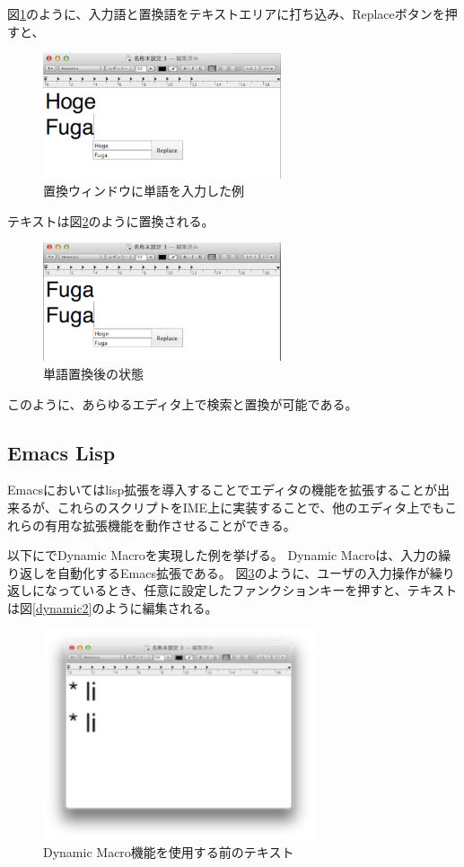 図\ref{search2}のように、入力語と置換語をテキストエリアに打ち込み、Replaceボタンを押すと、

\begin{figure}[H]
\centerline{\includegraphics[width=70mm,bb=0 0 360 191]{figures/replace2.png}}
\caption{置換ウィンドウに単語を入力した例}
\label{search2}
\end{figure}


テキストは図\ref{search3}のように置換される。

\begin{figure}[H]
\centerline{\includegraphics[width=70mm,bb=0 0 360 191]{figures/replace3.png}}
\caption{単語置換後の状態}
\label{search3}
\end{figure}

このように、あらゆるエディタ上で検索と置換が可能である。

\subsection{Emacs Lisp}
Emacsにおいてはlisp拡張を導入することでエディタの機能を拡張することが出来るが、これらのスクリプトをIME上に実装することで、他のエディタ上でもこれらの有用な拡張機能を動作させることができる。

以下に{\system}でDynamic Macro\cite{DynamicMacro}を実現した例を挙げる。
Dynamic Macroは、入力の繰り返しを自動化するEmacs拡張である。
図\ref{dynamic1}のように、ユーザの入力操作が繰り返しになっているとき、任意に設定したファンクションキーを押すと、テキストは図\ref{dynamic2}のように編集される。

\begin{figure}[H]
\centerline{\includegraphics[width=80mm,bb=0 0 360 220]{figures/dynamic1.png}}
\caption{Dynamic Macro機能を使用する前のテキスト}
\label{dynamic1}
\end{figure}

